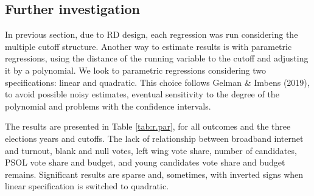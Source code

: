 \documentclass[
  12pt,
]{article}
\begin{document}
\hypertarget{further-investigation}{%
\subsection{Further investigation}\label{further-investigation}}

In previous section, due to RD design, each regression was run
considering the multiple cutoff structure. Another way to estimate
results is with parametric regressions, using the distance of the
running variable to the cutoff and adjusting it by a polynomial. We look
to parametric regressions considering two specifications: linear and
quadratic. This choice follows Gelman \& Imbens (2019), to avoid
possible noisy estimates, eventual sensitivity to the degree of the
polynomial and problems with the confidence intervals.

The results are presented in Table \ref{tab:r.par}, for all outcomes and
the three elections years and cutoffs. The lack of relationship between
broadband internet and turnout, blank and null votes, left wing vote
share, number of candidates, PSOL vote share and budget, and young
candidates vote share and budget remains. Significant results are sparse
and, sometimes, with inverted signs when linear specification is
switched to quadratic.

\begingroup\fontsize{10}{12}\selectfont
\end{document}
